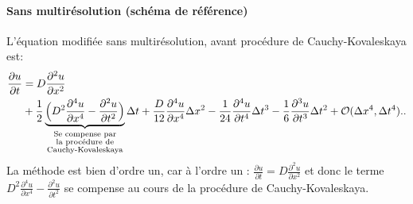     \paragraph{Sans multirésolution (schéma de référence)}
        L'équation modifiée sans multirésolution, avant procédure de Cauchy-Kovaleskaya est:
        \begin{align}
            \frac{\partial u}{\partial t}  &= D \frac{\partial^{2} u}{\partial x^{2}} \\\notag
                &+ \frac{1}{2} \underbrace{\Bigl(D^{2}\frac{\partial^{4} u}{\partial x^{4}} - \frac{\partial^{2} u}{\partial t^{2}} \Bigr)}_{\substack{\text{Se compense par} \\ \text{la procédure de} \\ \text{Cauchy-Kovaleskaya}}} \Delta t
                + \frac{D}{12} \frac{\partial^{4} u}{\partial x^{4}}  \Delta x^{2}
                - \frac{1}{24} \frac{\partial^{4} u}{\partial t^{4}}  \Delta t^{3} 
                - \frac{1}{6}  \frac{\partial^{3} u}{\partial t^{3}}  \Delta t^{2}
                + \mathcal{O}(\Delta x^4 , \Delta t^4)..
        \end{align}
        La méthode est bien d'ordre un, car à l'ordre un : $\frac{\partial u}{\partial t}  = D \frac{\partial^{2} u}{\partial x^{2}}$ et donc le terme $D^{2}\frac{\partial^{4} u}{\partial x^{4}} - \frac{\partial^{2} u}{\partial t^{2}}$
        se compense au cours de la procédure de Cauchy-Kovaleskaya.
